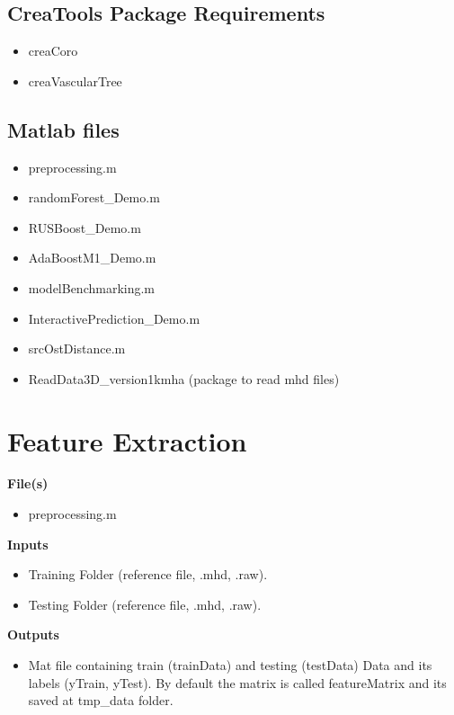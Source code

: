 \subsection{CreaTools Package Requirements}

\begin{itemize}
\item creaCoro
\item creaVascularTree
\end{itemize}

\subsection{Matlab files}

\begin{itemize}
\item preprocessing.m
\item randomForest\_Demo.m
\item RUSBoost\_Demo.m
\item AdaBoostM1\_Demo.m
\item modelBenchmarking.m
\item InteractivePrediction\_Demo.m
\item src\/OstDistance.m
\item ReadData3D\_version1k\/mha (package to read mhd files)
\end{itemize}

\section{Feature Extraction}

\textbf{File(s)}
\begin{itemize}
\item preprocessing.m
\end{itemize}

\textbf{Inputs}
\begin{itemize}
\item Training Folder (reference file, \* .mhd, \* .raw).
\item Testing Folder (reference file, \* .mhd, \* .raw).
\end{itemize}

\textbf{Outputs}
\begin{itemize}
\item Mat file containing train (trainData) and testing (testData) Data and its labels (yTrain, yTest). By default the matrix is called featureMatrix and its saved at tmp\_data folder.
\end{itemize}

